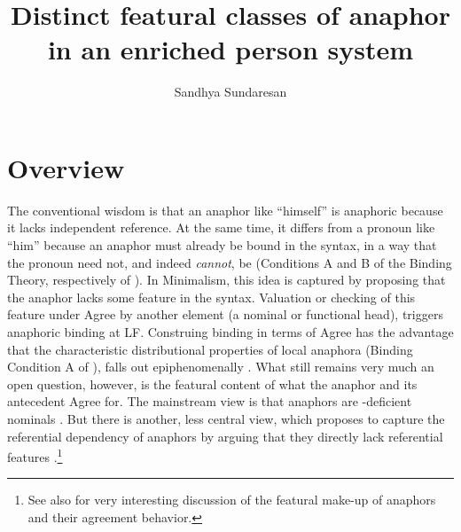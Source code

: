 \documentclass[output=paper, modfonts, nonflat]{langsci/langscibook}
\title{Distinct featural classes of anaphor in an enriched person system}
\author{Sandhya Sundaresan\affiliation{Universität Leipzig}}
\begin{document}
\maketitle

\section{Overview}

The conventional wisdom is that an anaphor like ``himself'' is
anaphoric because it lacks independent reference. At the same time, it
differs from a pronoun like ``him'' because an anaphor must already be
bound in the syntax, in a way that the pronoun need not, and indeed
\textit{cannot}, be (Conditions A and B of the Binding Theory,
respectively of \citealt{Chomsky:1981}).  In Minimalism, this idea is
captured by proposing that the anaphor lacks some feature in the
syntax. Valuation or checking of this feature under Agree by another
element (a nominal or functional head), triggers anaphoric binding at
LF. Construing binding in terms of Agree has the advantage that the
characteristic distributional properties of local anaphora (Binding
Condition A of \citealt{Chomsky:1981}), falls out epiphenomenally
\citep{Hicks:2009}. What still remains very much an open question,
however, is the featural content of what the anaphor and its
antecedent Agree for. The mainstream view is that anaphors are
\ph-deficient nominals \citep{heinat:2008, kratzer:2009, reuland:2001,
  Reuland:2011, roorwyn:2011}. But there is another, less central
view, which proposes to capture the referential dependency of anaphors
by arguing that they directly lack referential features
\citep{adgerramchand:2005, Hicks:2009}.\footnote{See also  for very interesting discussion of the featural make-up of anaphors and their agreement behavior.}
\end{document}
